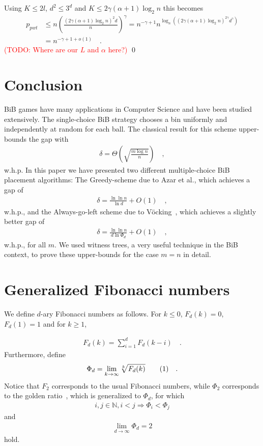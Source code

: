 \documentclass[a4paper,12pt]{article}
\newcommand\todo[1]{\textcolor{red}{(TODO: #1)}}
\newcommand\numberthis{\addtocounter{equation}{1}\tag{\theequation}}
\newcommand\neqn[1]{\numberthis\label{eqn:#1}}
\begin{document}
Using $K \leq 2l$, $d^2 \leq 3^d$ and $K \leq 2\gamma  \left( \alpha +1 \right)  \log_2 n$ this becomes
\begin{align*}
p_{pwt} &\leq n \left(\frac{\left(2\gamma  \left(\alpha +1 \right)  \log_2 n\right)^2 d}{n}\right)^\gamma 
        = n^{-\gamma +1}  n ^{\log_n\left( \left(2\gamma \left(\alpha+1\right) \log_2n \right)^{2\gamma}  d^\gamma \right)} \\
        &= n^{-\gamma+1+o\left(1\right)} \quad .
\end{align*}
\todo{Where are our $L$ and $\alpha$ here?}
\qed
 
\section{Conclusion}
\label{sec:conclusion}
BiB games have many applications in Computer Science and have been studied extensively. The single-choice BiB strategy chooses a bin uniformly and independently at random for each ball. The classical result for this scheme upper-bounds the gap with~\cite{RS98}
\begin{align*}
\delta =  \Theta\left(\sqrt{\frac{m  \log n}{n}}\right) \quad ,
\end{align*}
w.h.p.
In this paper we have presented two different multiple-choice BiB placement algorithms: The Greedy-scheme due to Azar et al.\cite{ABKU99}, which achieves a gap of 
\begin{align*}
\delta = \frac{\ln\ln n}{\ln d} + O(1) \quad ,
\end{align*}
w.h.p., and the Always-go-left scheme due to V\"ocking~\cite{VOC03}, which achieves a slightly better gap of
\begin{align*}
\delta = \frac{\ln \ln n}{d \ln \Phi_d} + O(1) \quad ,
\end{align*}
w.h.p., for all $m$. We used witness trees, a very useful technique in the BiB context, to prove these upper-bounds for the case $m=n$ in detail.


\appendix
\section{Generalized Fibonacci numbers}
\label{sec:fibonacci}
We define $d$-ary Fibonacci numbers as follows. For $k \leq0$, $F_d(k) = 0$, $F_d(1) = 1$ and for $k \geq 1$,

\begin{align*}
F_d(k) = \sum_{i=1}^{d}F_d(k-i) \quad .
\end{align*}
Furthermore, define 
\begin{align*}
\Phi_d = \lim_{k \rightarrow \infty} \sqrt[k]{F_d(k)} \neqn{goldenFib} \quad .
\end{align*}
Notice that $F_2$ corresponds to the usual Fibonacci numbers, while $\Phi_2 $ corresponds to the golden ratio~\cite{Knuth73}, which is generalized to $\Phi_d$, for which 
\begin{align*}
i, j \in \mathbb{N}, i < j \Rightarrow \Phi_i < \Phi_j
\end{align*}
and 
\begin{align*}
\lim_{d\rightarrow \infty} \Phi_d = 2
\end{align*}
hold.
\end{document}
